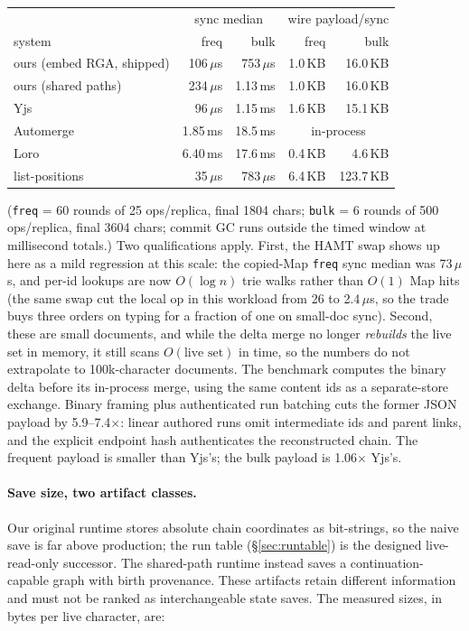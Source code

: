 \documentclass[11pt]{article}
\newcommand{\code}[1]{\texttt{#1}}
\begin{document}
\begin{center}\small
\begin{tabular}{@{}lrrrr@{}}
\toprule
 & \multicolumn{2}{c}{sync median} & \multicolumn{2}{c}{wire payload/sync} \\
system & freq & bulk & freq & bulk \\
\midrule
ours (embed RGA, shipped) & 106\,$\mu$s & 753\,$\mu$s & 1.0\,KB & 16.0\,KB \\
ours (shared paths) & 234\,$\mu$s & 1.13\,ms & 1.0\,KB & 16.0\,KB \\
Yjs & 96\,$\mu$s & 1.15\,ms & 1.6\,KB & 15.1\,KB \\
Automerge & 1.85\,ms & 18.5\,ms & \multicolumn{2}{c}{in-process} \\
Loro & 6.40\,ms & 17.6\,ms & 0.4\,KB & 4.6\,KB \\
list-positions & 35\,$\mu$s & 783\,$\mu$s & 6.4\,KB & 123.7\,KB \\
\bottomrule
\end{tabular}
\end{center}

\noindent (\code{freq} = 60 rounds of 25 ops/replica, final 1804 chars;
\code{bulk} = 6 rounds of 500 ops/replica, final 3604 chars; commit GC
runs outside the timed window at millisecond totals.) Two qualifications
apply. First, the HAMT swap shows up here as a mild regression at this
scale: the copied-Map \code{freq} sync median was 73\,$\mu$s, and per-id
lookups are now $O(\log n)$ trie walks rather than $O(1)$ Map hits (the
same swap cut the local op in this workload from 26 to 2.4\,$\mu$s, so
the trade buys three orders on typing for a fraction of one on small-doc
sync). Second, these are small documents, and while the delta merge no
longer \emph{rebuilds} the live set in memory, it still scans
$O(\text{live set})$ in time, so the numbers do not extrapolate to
100k-character documents. The benchmark computes the binary delta before its
in-process merge, using the same content ids as a separate-store exchange.
Binary framing plus authenticated run batching cuts the former JSON payload by
5.9--7.4$\times$: linear authored runs omit intermediate ids and parent links,
and the explicit endpoint hash authenticates the reconstructed chain. The
frequent payload is smaller than Yjs's; the bulk payload is 1.06$\times$ Yjs's.

\paragraph{Save size, two artifact classes.} Our original runtime stores
absolute chain coordinates as bit-strings, so the naive save is far above
production; the run table (\S\ref{sec:runtable}) is the designed
live-read-only successor. The shared-path runtime instead saves a
continuation-capable graph with birth provenance. These artifacts retain
different information and must not be ranked as interchangeable state saves.
The measured sizes, in bytes per live character, are:
\end{document}
